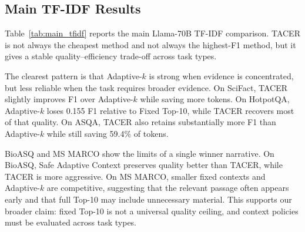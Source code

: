 \documentclass[11pt]{article}
\begin{document}
\subsection{Main TF-IDF Results}

Table~\ref{tab:main_tfidf} reports the main Llama-70B TF-IDF comparison. TACER is not always the cheapest method and not always the highest-F1 method, but it gives a stable quality--efficiency trade-off across task types.

\begin{table}[t]
\centering
\small
\caption{Main Llama-70B TF-IDF results. Reductions are relative to Fixed Top-10.}
\label{tab:main_tfidf}
\end{table}

The clearest pattern is that Adaptive-$k$ is strong when evidence is concentrated, but less reliable when the task requires broader evidence. On SciFact, TACER slightly improves F1 over Adaptive-$k$ while saving more tokens. On HotpotQA, Adaptive-$k$ loses 0.155 F1 relative to Fixed Top-10, while TACER recovers most of that quality. On ASQA, TACER also retains substantially more F1 than Adaptive-$k$ while still saving 59.4\% of tokens.

BioASQ and MS MARCO show the limits of a single winner narrative. On BioASQ, Safe Adaptive Context preserves quality better than TACER, while TACER is more aggressive. On MS MARCO, smaller fixed contexts and Adaptive-$k$ are competitive, suggesting that the relevant passage often appears early and that full Top-10 may include unnecessary material. This supports our broader claim: fixed Top-10 is not a universal quality ceiling, and context policies must be evaluated across task types.
\end{document}
